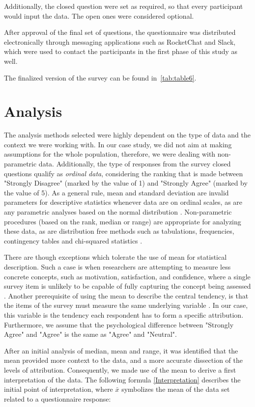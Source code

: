 Additionally, the closed question were set as required, so that every participant would input the data. The open ones were considered optional. 

After approval of the final set of questions, the questionnaire was distributed electronically through messaging applications such as RocketChat and Slack, which were used to contact the participants in the first phase of this study as well.

The  finalized version of the survey can be found in~\autoref{tab:table6}.

\section{Analysis} \label{Analysis}

The analysis methods selected were highly dependent on the type of data and the context we were working with. In our case study, we did not aim at making assumptions for the whole population, therefore, we were dealing with non-parametric data. Additionally, the type of responses from the survey closed questions qualify as \textit{ordinal data}, considering the ranking that is made between "Strongly Disagree" (marked by the value of 1) and "Strongly Agree" (marked by the value of 5). As a general rule, mean and standard deviation are invalid parameters for descriptive statistics whenever data are on ordinal scales, as are any parametric analyses based on the normal distribution \cite{Allen2007}. Non-parametric procedures (based on the rank, median or range) are appropriate for analyzing these data, as are distribution free methods such as tabulations, frequencies, contingency tables and chi-squared statistics \cite{Sullivan2013}. 

There are though exceptions which tolerate the use of mean for statistical description. Such a case is when researchers are attempting to measure less concrete concepts, such as motivation,  satisfaction, and confidence, where a single survey item is unlikely to be capable of fully
capturing the concept being assessed \cite{Rickards2012}. Another prerequisite of using the mean to describe the central tendency, is that the items of the survey must measure the same underlying variable \cite{Sullivan2013}. In our case, this variable is the tendency each respondent has to form a specific attribution. Furthermore, we assume that the psychological difference between "Strongly Agree" and "Agree" is the same as "Agree" and "Neutral".

After an initial analysis of median, mean and range, it was identified that the mean provided more context to the data, and a more accurate dissection of the levels of attribution. Consequently, we made use of the mean to derive a first interpretation of the data. The following formula \eqref{Interpretation} describes the initial point of interpretation, where $\bar{x}$ symbolizes the mean of the data set related to a questionnaire response:

